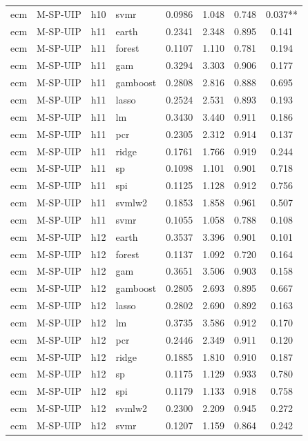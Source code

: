 \begin{ThreePartTable}
\begin{longtable}[t]{llclcccc}
ecm & M-SP-UIP & h10 & svmr & 0.0986 & 1.048 & 0.748 & 0.037**\\
\addlinespace
ecm & M-SP-UIP & h11 & earth & 0.2341 & 2.348 & 0.895 & 0.141\\
ecm & M-SP-UIP & h11 & forest & 0.1107 & 1.110 & 0.781 & 0.194\\
ecm & M-SP-UIP & h11 & gam & 0.3294 & 3.303 & 0.906 & 0.177\\
ecm & M-SP-UIP & h11 & gamboost & 0.2808 & 2.816 & 0.888 & 0.695\\
ecm & M-SP-UIP & h11 & lasso & 0.2524 & 2.531 & 0.893 & 0.193\\
ecm & M-SP-UIP & h11 & lm & 0.3430 & 3.440 & 0.911 & 0.186\\
ecm & M-SP-UIP & h11 & pcr & 0.2305 & 2.312 & 0.914 & 0.137\\
ecm & M-SP-UIP & h11 & ridge & 0.1761 & 1.766 & 0.919 & 0.244\\
ecm & M-SP-UIP & h11 & sp & 0.1098 & 1.101 & 0.901 & 0.718\\
ecm & M-SP-UIP & h11 & spi & 0.1125 & 1.128 & 0.912 & 0.756\\
ecm & M-SP-UIP & h11 & svmlw2 & 0.1853 & 1.858 & 0.961 & 0.507\\
ecm & M-SP-UIP & h11 & svmr & 0.1055 & 1.058 & 0.788 & 0.108\\
\addlinespace
ecm & M-SP-UIP & h12 & earth & 0.3537 & 3.396 & 0.901 & 0.101\\
ecm & M-SP-UIP & h12 & forest & 0.1137 & 1.092 & 0.720 & 0.164\\
ecm & M-SP-UIP & h12 & gam & 0.3651 & 3.506 & 0.903 & 0.158\\
ecm & M-SP-UIP & h12 & gamboost & 0.2805 & 2.693 & 0.895 & 0.667\\
ecm & M-SP-UIP & h12 & lasso & 0.2802 & 2.690 & 0.892 & 0.163\\
ecm & M-SP-UIP & h12 & lm & 0.3735 & 3.586 & 0.912 & 0.170\\
ecm & M-SP-UIP & h12 & pcr & 0.2446 & 2.349 & 0.911 & 0.120\\
ecm & M-SP-UIP & h12 & ridge & 0.1885 & 1.810 & 0.910 & 0.187\\
ecm & M-SP-UIP & h12 & sp & 0.1175 & 1.129 & 0.933 & 0.780\\
ecm & M-SP-UIP & h12 & spi & 0.1179 & 1.133 & 0.918 & 0.758\\
ecm & M-SP-UIP & h12 & svmlw2 & 0.2300 & 2.209 & 0.945 & 0.272\\
ecm & M-SP-UIP & h12 & svmr & 0.1207 & 1.159 & 0.864 & 0.242\\

\end{longtable}
\end{ThreePartTable}
